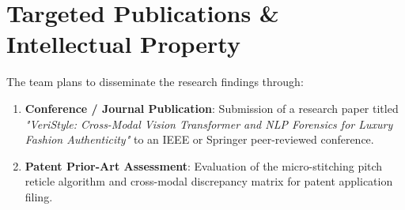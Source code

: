 \section{Targeted Publications & Intellectual Property}
The team plans to disseminate the research findings through:
\begin{enumerate}
    \item \textbf{Conference / Journal Publication}: Submission of a research paper titled \textit{"VeriStyle: Cross-Modal Vision Transformer and NLP Forensics for Luxury Fashion Authenticity"} to an IEEE or Springer peer-reviewed conference.
    \item \textbf{Patent Prior-Art Assessment}: Evaluation of the micro-stitching pitch reticle algorithm and cross-modal discrepancy matrix for patent application filing.
\end{enumerate}
